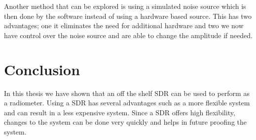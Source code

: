 Another method that can be explored is using a simulated noise source which is then done by the software instead of using a hardware based source.  This has two advantages; one it eliminates the need for additional hardware and two we now have control over the noise source and are able to change the amplitude if needed.  

\section{Conclusion}
In this thesis we have shown that an off the shelf SDR can be used to perform as a radiometer.  Using a SDR has several advantages such as a more flexible system and can result in a less expensive system.  Since a SDR offers high flexibility, changes to the system can be done very quickly and helps in future proofing the system.  